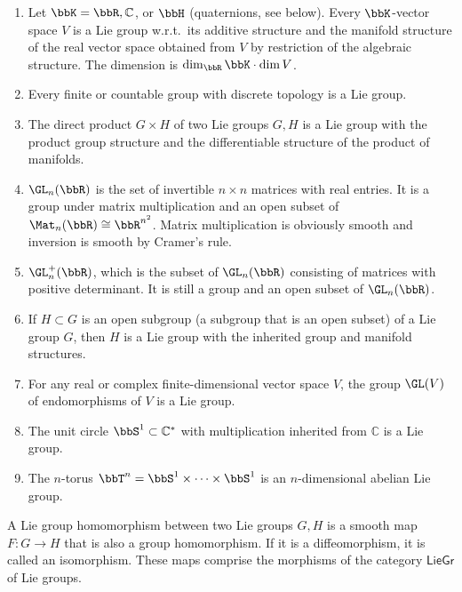 \begin{example}
    \begin{enumerate}[label=(\alph*)]
        \item Let $\bbK=\bbR ,\mathbb{C}$, or $\bbH $ (quaternions, see below). Every $\bbK$-vector space $V$ is a Lie group w.r.t.\ its additive structure and the manifold structure of the real vector space obtained from $V$ by restriction of the algebraic structure. The dimension is $\dim_{\bbR }\bbK\cdot \dim V$.
        \item Every finite or countable group with discrete topology is a Lie group.
        \item The direct product $G\times H$ of two Lie groups $G,H$ is a Lie group with the product group structure and the differentiable structure of the product of manifolds.
        \item $\GL_n(\bbR )$ is the set of invertible $n\times n$ matrices with real entries. It is a group under matrix multiplication and an open subset of $\Mat_n(\bbR )\cong \bbR^{n^2}$. Matrix multiplication is obviously smooth and inversion is smooth by Cramer's rule.
        \item $\GL^+_n(\bbR )$, which is the subset of $\GL_n(\bbR )$ consisting of matrices with positive determinant. It is still a group and an open subset of $\GL_n(\bbR )$.
        \item If $H\subset G$ is an open subgroup (a subgroup that is an open subset) of a Lie group $G$, then $H$ is a Lie group with the inherited group and manifold structures.
        \item For any real or complex finite-dimensional vector space $V$, the group $\GL(V)$ of endomorphisms of $V$ is a Lie group.
        \item The unit circle $\bbS^1\subset \mathbb{C}^\ast$ with multiplication inherited from $\mathbb{C}$ is a Lie group.
        \item The $n$-torus $\bbT^n=\bbS^1\times\cdots\times \bbS^1$ is an $n$-dimensional abelian Lie group.
    \end{enumerate}
\end{example}

\begin{defn}
    A Lie group homomorphism between two Lie groups $G,H$ is a smooth map $F:G\to H$ that is also a group homomorphism. If it is a diffeomorphism, it is called an isomorphism. These maps comprise the morphisms of the category $\mathsf{LieGr}$ of Lie groups.
\end{defn} 

